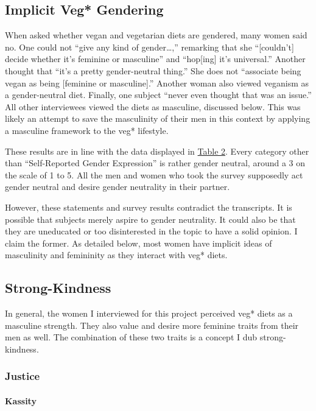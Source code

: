 \documentclass[twoside]{report}
\begin{document}
\subsection{Implicit Veg* Gendering}

When asked whether vegan and vegetarian diets are gendered, many women
said no. One could not ``give any kind of gender\ldots,'' remarking
that she ``{[}couldn't{]} decide whether it's feminine or masculine''
and ``hop{[}ing{]} it's universal.'' Another thought that ``it's a
pretty gender-neutral thing.'' She does not ``associate being vegan as
being {[}feminine or masculine{]}.'' Another woman also viewed veganism as
a gender-neutral diet. Finally, one subject ``never even thought that
was an issue.'' All other interviewees viewed the diets as masculine,
discussed below. This was likely an attempt to save the masculinity of
their men in this context by applying a masculine framework to the veg* lifestyle.

These results are in line with the data displayed in \hyperlink{table-2}{Table 2}. Every category other than ``Self-Reported Gender Expression'' is rather gender neutral, around a 3 on the scale of 1 to 5. All the men and women who
took the survey supposedly act gender neutral and desire gender
neutrality in their partner.

However, these statements and survey results contradict the transcripts. It is possible that subjects merely aspire to gender neutrality. It could also be that they are uneducated or too disinterested in the topic to have a solid opinion. I claim the former. As detailed below, most women have implicit ideas of masculinity and femininity as they interact with veg* diets.

\subsection{Strong-Kindness}

In general, the women I interviewed for this project perceived veg* diets as a
masculine strength. They also value and desire more feminine traits from
their men as well. The combination of these two traits is a concept I
dub strong-kindness.

\subsubsection{Justice}

\paragraph{Kassity}
\end{document}
